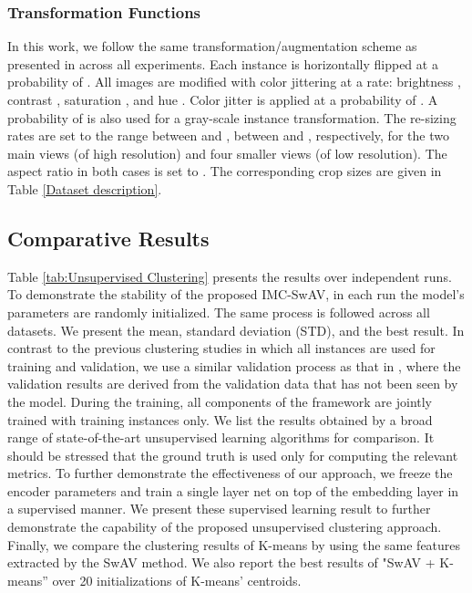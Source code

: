 \documentclass[journal]{IEEEtran}
\begin{document}
\subsubsection{Transformation Functions} 
In this work, we follow the same transformation/augmentation scheme as presented in \cite{pmlr-v119-chen20j} across all experiments. Each instance is horizontally flipped at a probability of . All images are modified with color jittering at a rate: brightness , contrast , saturation , and hue . Color jitter is applied at a probability of . A probability of  is also used for a gray-scale instance transformation. The re-sizing rates are set to the range between  and , between  and , respectively, for the two main views (of high resolution) and four smaller views (of low resolution). The aspect ratio in both cases is set to . The corresponding crop sizes are given in Table \ref{Dataset description}.


\subsection{Comparative Results}

Table \ref{tab:Unsupervised Clustering} presents the results over  independent runs. To demonstrate the stability of the proposed IMC-SwAV, in each run the model's parameters are randomly initialized. The same process is followed across all datasets. We present the mean, standard deviation (STD), and the best result. In contrast to the previous clustering studies in which all instances are used for training and validation, we use a similar validation process as that in \cite{10.1007/978-3-030-58607-2_16}, where the validation results are derived from the validation data that has not been seen by the model. During the training, all components of the framework are jointly trained with training instances only. We list the results obtained by a broad range of  state-of-the-art unsupervised learning algorithms for comparison. It should be stressed that the ground truth is used only for computing the relevant metrics. To further demonstrate the effectiveness of our approach, we freeze the encoder parameters and train a single layer net on top of the embedding layer in a supervised manner. We present these supervised learning result to further demonstrate the capability of the proposed unsupervised clustering approach. Finally, we compare the clustering results of K-means by using the same features extracted by the SwAV method. We also report the best results of "SwAV + K-means'' over 20 initializations of K-means' centroids. \par
\end{document}
